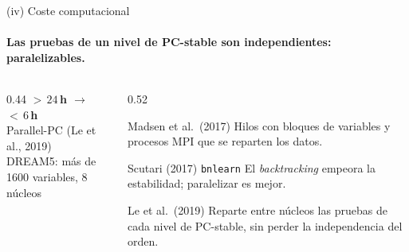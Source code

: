 \documentclass[aspectratio=169,11pt]{beamer}
\begin{document}
\begin{frame}[t]{(iv) Coste computacional}
  \framesubtitle{Las pruebas de un nivel de PC-stable son independientes: paralelizables.}
  \vspace{0.2cm}
  \begin{columns}[T,onlytextwidth]
    \begin{column}{0.44\textwidth}
      \centering
      {\color{upmblue}\fontsize{22}{26}\selectfont\bfseries
      ${>}\,24$\,h $\to$ {\color{upmorange}${<}\,6$\,h}}\\[0.2cm]
      {\small Parallel-PC (Le et al., 2019)\\
      DREAM5: más de 1600 variables, 8 núcleos}\\[0.4cm]
    \end{column}
    \begin{column}{0.52\textwidth}
      \begin{block}{Madsen et al.\ (2017)}
        Hilos con bloques de variables y procesos MPI que se reparten los
        datos.
      \end{block}
      \begin{block}{Scutari (2017) \textperiodcentered{} \texttt{bnlearn}}
        El \emph{backtracking} empeora la estabilidad; paralelizar es mejor.
      \end{block}
      \begin{block}{Le et al.\ (2019)}
        Reparte entre núcleos las pruebas de cada nivel de PC-stable, sin
        perder la independencia del orden.
      \end{block}
    \end{column}
  \end{columns}
\end{frame}
\end{document}
